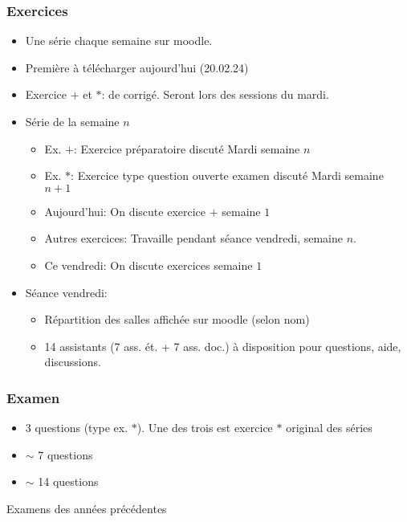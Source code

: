    \begin{frame}
     \frametitle{Exercices}

     \begin{itemize}
     \item Une série chaque semaine sur moodle.
     \item Première à télécharger  aujourd'hui (20.02.24)
     \item Exercice $+$ et $*$:  de corrigé. Seront  lors des sessions du mardi.
     \item Série de la semaine $n$
       \begin{itemize}
       \item Ex. $+$: Exercice préparatoire discuté Mardi semaine $n$
       \item Ex. $*$: Exercice type question ouverte examen   discuté Mardi semaine $n+1$
       \item Aujourd'hui: On discute exercice $+$ semaine $1$
       \item Autres exercices: Travaille pendant séance vendredi, semaine $n$.
       \item Ce vendredi: On discute exercices semaine $1$
       \end{itemize}
     \item Séance vendredi:
       \begin{itemize}
       \item Répartition des salles affichée sur moodle (selon nom)
       \item 14 assistants (7 ass. ét. + 7 ass. doc.) à disposition pour questions, aide, discussions. 
       \end{itemize}
       
     \end{itemize}
     
   \end{frame}

   \begin{frame}
     \frametitle{Examen}

     \begin{itemize}
     \item 3 questions  (type ex. $*$). Une des trois est exercice $*$ original des séries
     \item $∼$ 7 questions   
     \item  $∼$ 14 questions      
     \end{itemize}

     \bigskip

     Examens des années précédentes  
   \end{frame}

